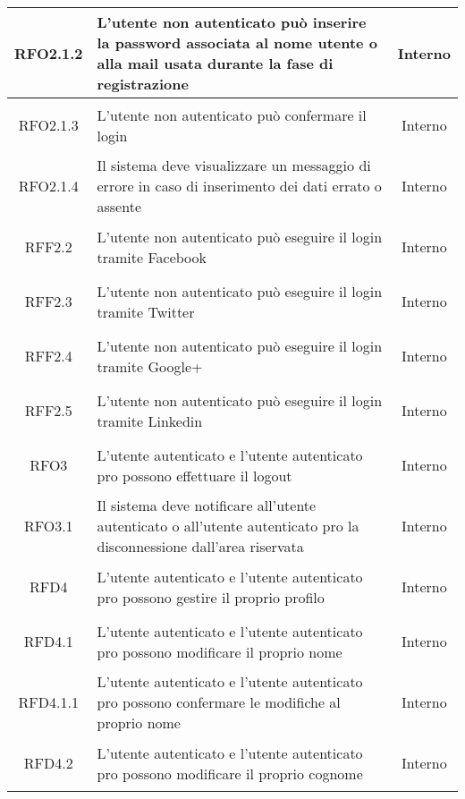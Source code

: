 \begin{longtable}{|c|>{\centering}m{7cm}|c|}
\hypertarget{RFO2.1.2}{RFO2.1.2} & L'utente non autenticato può inserire la password associata al nome utente o alla mail usata durante la fase di registrazione & Interno
\\ \hline

\hypertarget{RFO2.1.3}{RFO2.1.3} & L'utente non autenticato può confermare il login & Interno
\\ \hline

\hypertarget{RFO2.1.4}{RFO2.1.4} & Il sistema deve visualizzare un messaggio di errore in caso di inserimento dei dati errato o assente & Interno
\\ \hline

\hypertarget{RFF2.2}{RFF2.2} & L'utente non autenticato può eseguire il login tramite Facebook & Interno
\\ \hline

\hypertarget{RFF2.3}{RFF2.3} & L'utente non autenticato può eseguire il login tramite Twitter & Interno
\\ \hline

\hypertarget{RFF2.4}{RFF2.4} & L'utente non autenticato può eseguire il login tramite Google+ & Interno
\\ \hline

\hypertarget{RFF2.5}{RFF2.5} & L'utente non autenticato può eseguire il login tramite Linkedin & Interno
\\ \hline

\hypertarget{RFO3}{RFO3} & L’utente autenticato e l’utente autenticato pro possono effettuare il logout & Interno
\\ \hline

\hypertarget{RFO3.1}{RFO3.1} & Il sistema deve notificare all’utente autenticato o all’utente autenticato pro la disconnessione dall’area riservata & Interno
\\ \hline

\hypertarget{RFD4}{RFD4} & L’utente autenticato e l’utente autenticato pro possono gestire il proprio profilo & Interno
\\ \hline

\hypertarget{RFD4.1}{RFD4.1} & L’utente autenticato e l’utente autenticato pro possono modificare il proprio nome  & Interno
\\ \hline

\hypertarget{RFD4.1.1}{RFD4.1.1} & L’utente autenticato e l’utente autenticato pro possono confermare le modifiche al proprio nome & Interno
\\ \hline

\hypertarget{RFD4.2}{RFD4.2} & L’utente autenticato e l’utente autenticato pro possono modificare il proprio cognome  & Interno
\\ \hline


\end{longtable}
